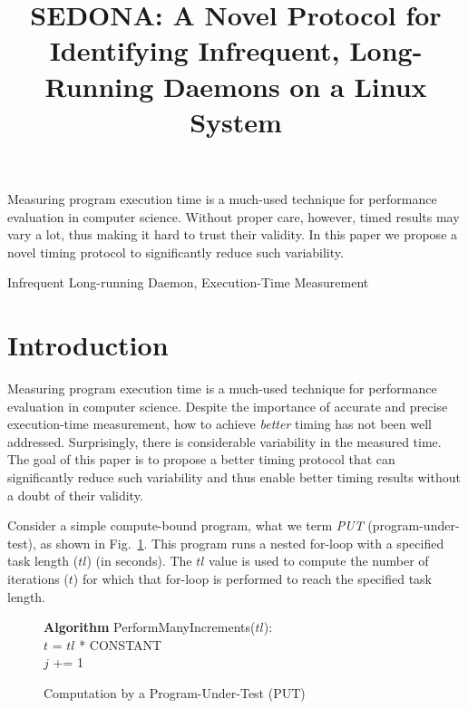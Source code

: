 \documentclass[letter]{ieice}
\title{SEDONA: A Novel Protocol for Identifying Infrequent, Long-Running Daemons on a Linux System}
\begin{document}
\maketitle

\begin{summary}
Measuring program execution time is 
a \hbox{much-used} technique for performance evaluation in computer science. 
Without proper care, however, timed results may vary a lot, 
thus making it hard to trust their validity. 
In this paper we propose a novel timing protocol to significantly 
reduce such variability.

\end{summary}
\begin{keywords}
Infrequent Long-running Daemon, Execution-Time Measurement
\end{keywords}

\section{Introduction}
\label{sec:intro}

Measuring program execution time is a much-used
technique for performance evaluation in computer science. 
Despite the importance of accurate and precise execution-time measurement, 
how to achieve {\em better} timing has not been well addressed. 
Surprisingly, there is considerable variability in the measured time.
The goal of this paper is to propose
a better timing protocol that can significantly reduce such variability 
and thus enable better timing results without a doubt of their validity.

Consider a simple compute-bound program, what we term {\em PUT} (program-under-test), 
as shown in Fig.~\ref{alg:put}. 
This program runs a nested for-loop with a specified task length ($tl$) (in seconds). 
The $tl$ value is used to compute 
the number of iterations ($t$) for which that for-loop is performed 
to reach the specified task length.

\vspace{-.2in}
\begin{figure}[h]
\begin{center}
\begin{algorithmic}
{\bf Algorithm} PerformManyIncrements($tl$): \\
\STATE $t$ = $tl$ * {CONSTANT} \\
		\STATE $j$ += 1 \\
	\ENDFOR 
\ENDFOR 
\end{algorithmic}
\end{center}
\caption{Computation by a Program-Under-Test (PUT)\label{alg:put}}
\vspace{-.2in}
\end{figure}
\end{document}
